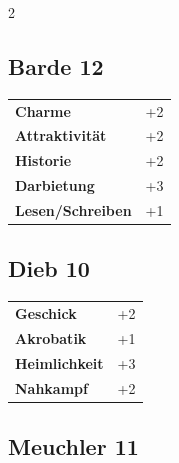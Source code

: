 \begin{multicols}{2}
\begin{tcolorbox}
\end{tcolorbox}

\begin{tcolorbox}
    \subsection*{Barde \hfill \small{12 }}
    \tcblower




\begin{tabular}{@{}ll@{}}
    \textbf{Charme} & +2\\
    \textbf{Attraktivität} & +2\\
    \textbf{Historie} & +2\\
    \textbf{Darbietung} & +3\\
    \textbf{Lesen/Schreiben} & +1\\
\end{tabular}


\end{tcolorbox}

\begin{tcolorbox}
    \subsection*{Dieb \hfill \small{10 }}
    \tcblower




\begin{tabular}{@{}ll@{}}
    \textbf{Geschick} & +2\\
    \textbf{Akrobatik} & +1\\
    \textbf{Heimlichkeit} & +3\\
    \textbf{Nahkampf} & +2\\
\end{tabular}


\end{tcolorbox}

\begin{tcolorbox}
    \subsection*{Meuchler \hfill \small{11 }}
    \tcblower





\end{tcolorbox}
\end{multicols}
